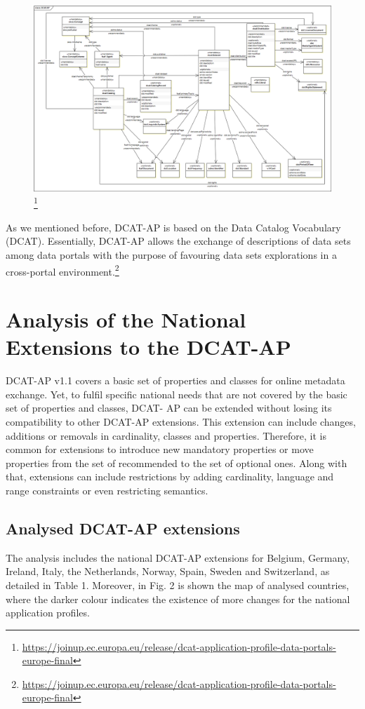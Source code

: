 \documentclass[<options>]{elsarticle}
\begin{document}
\begin{figure}[H]
\includegraphics[width=1\textwidth]{DCAT-AP_Final_v1_00.png}
\caption[Caption for LOC]{\footnote{\href{DCAT-AP UML Class Diagram}{https://joinup.ec.europa.eu/release/dcat-application-profile-data-portals-europe-final}}}
\end{figure}

As we mentioned before, DCAT-AP is based on the Data Catalog Vocabulary (DCAT). Essentially, DCAT-AP allows the exchange of descriptions of data sets among data portals with the purpose of favouring data sets explorations in a cross-portal environment.\footnote{\href{DCAT Application Profile for Data Portals in Europe}{https://joinup.ec.europa.eu/release/dcat-application-profile-data-portals-europe-final}}

\section{Analysis of the National Extensions to the DCAT-AP}
DCAT-AP v1.1 covers a basic set of properties and classes for online metadata exchange. Yet, to fulfil specific national needs that are not covered by the basic set of properties and classes, DCAT- AP can be extended without losing its compatibility to other DCAT-AP extensions. This extension can include changes, additions or removals in cardinality, classes and properties. Therefore, it is common for extensions to introduce new mandatory properties or move properties from the set of recommended to the set of optional ones. Along with that, extensions can include restrictions by adding cardinality, language and range constraints or even restricting semantics.

\subsection{Analysed DCAT-AP extensions}
The analysis includes the national DCAT-AP extensions for Belgium, Germany, Ireland, Italy, the Netherlands, Norway, Spain, Sweden and Switzerland, as detailed in Table 1. Moreover, in Fig. 2 is shown the map of analysed countries, where the darker colour indicates the existence of more changes for the national application profiles. 
\end{document}

